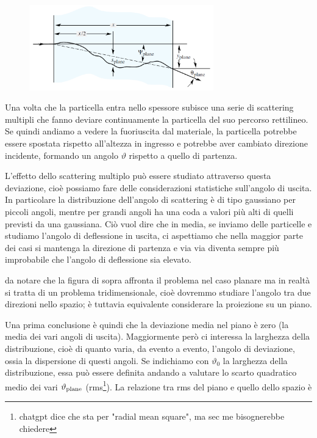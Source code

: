 \hspace{-0.2cm}\begin{minipage}{0.495\textwidth}
    \begin{figure}[H]
        \centering
        \includegraphics[width=8cm]{immagini/scattering_multiplo_1.png}
    \end{figure}
\end{minipage}
\hspace{0.2cm}\begin{minipage}{0.5\textwidth}
    \vspace{0.6cm}Una volta che la particella entra nello spessore subisce una serie di scattering multipli che fanno deviare continuamente la particella del suo percorso rettilineo. Se quindi andiamo a vedere la fuoriuscita dal materiale, la particella potrebbe essere spostata rispetto all'altezza in ingresso e potrebbe aver cambiato direzione incidente, formando un angolo $\vartheta$ rispetto a quello di partenza.
\end{minipage}

\vspace{0.2cm}L'effetto dello scattering multiplo può essere studiato attraverso questa deviazione, cioè possiamo fare delle considerazioni statistiche sull'angolo di uscita. In particolare la distribuzione dell'angolo di scattering è di tipo gaussiano per piccoli angoli, mentre per grandi angoli ha una coda a valori più alti di quelli previsti da una gaussiana. Ciò vuol dire che in media, se inviamo delle particelle e studiamo l'angolo di deflessione in uscita, ci aspettiamo che nella maggior parte dei casi si mantenga la direzione di partenza e via via diventa sempre più improbabile che l'angolo di deflessione sia elevato.

\E da notare che la figura di sopra affronta il problema nel caso planare ma in realtà si tratta di un problema tridimensionale, cioè dovremmo studiare l'angolo tra due direzioni nello spazio; è tuttavia equivalente considerare la proiezione su un piano.

Una prima conclusione è quindi che la deviazione media nel piano è zero (la media dei vari angoli di uscita). Maggiormente però ci interessa la larghezza della distribuzione, cioè di quanto varia, da evento a evento, l'angolo di deviazione, ossia la dispersione di questi angoli. Se indichiamo con $\vartheta_0$ la larghezza della distribuzione, essa può essere definita andando a valutare lo scarto quadratico medio dei vari $\vartheta_{\rm plane}$ (rms\footnote{chatgpt dice che sta per "radial mean square", ma sec me bisognerebbe chiedere}). La relazione tra rms del piano e quello dello spazio è

